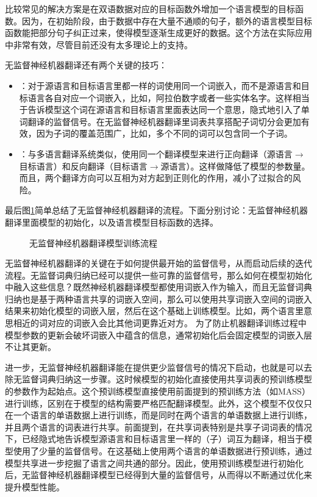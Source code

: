 \parinterval 比较常见的解决方案是在双语数据对应的目标函数外增加一个语言模型的目标函数。因为，在初始阶段，由于数据中存在大量不通顺的句子，额外的语言模型目标函数能把部分句子纠正过来，使得模型逐渐生成更好的数据。这个方法在实际应用中非常有效，尽管目前还没有太多理论上的支持。

\parinterval 无监督神经机器翻译还有两个关键的技巧：
\begin{itemize}
\item {\small{}}：对于源语言和目标语言里都一样的词使用同一个词嵌入，而不是源语言和目标语言各自对应一个词嵌入，比如，阿拉伯数字或者一些实体名字。这样相当于告诉模型这个词在源语言和目标语言里面表达同一个意思，隐式地引入了单词翻译的监督信号。在无监督神经机器翻译里词表共享搭配子词切分会更加有效，因为子词的覆盖范围广，比如，多个不同的词可以包含同一个子词。

\vspace{0.5em}
\item {\small{}}：与多语言翻译系统类似，使用同一个翻译模型来进行正向翻译（源语言$\to$目标语言）和反向翻译（目标语言$\to$源语言）。这样做降低了模型的参数量。而且，两个翻译方向可以互相为对方起到正则化的作用，减小了过拟合的风险。
\end{itemize}

\parinterval 最后图\ref{fig:16-19}简单总结了无监督神经机器翻译的流程。下面分别讨论：无监督神经机器翻译里面模型的初始化，以及语言模型目标函数的选择。
\begin{figure}[h]
\centering

\caption{无监督神经机器翻译模型训练流程}
\label{fig:16-19}
\end{figure}


\parinterval 无监督神经机器翻译的关键在于如何提供最开始的监督信号，从而启动后续的迭代流程。无监督词典归纳已经可以提供一些可靠的监督信号，那么如何在模型初始化中融入这些信息？既然神经机器翻译模型都使用词嵌入作为输入，而且无监督词典归纳也是基于两种语言共享的词嵌入空间，那么可以使用共享词嵌入空间的词嵌入结果来初始化模型的词嵌入层，然后在这个基础上训练模型。比如，两个语言里意思相近的词对应的词嵌入会比其他词更靠近对方。 为了防止机器翻译训练过程中模型参数的更新会破坏词嵌入中蕴含的信息，通常初始化后会固定模型的词嵌入层不让其更新。

\parinterval 进一步，无监督神经机器翻译能在提供更少监督信号的情况下启动，也就是可以去除无监督词典归纳这一步骤。这时候模型的初始化直接使用共享词表的预训练模型的参数作为起始点。这个预训练模型直接使用前面提到的预训练方法（如MASS）进行训练，区别在于模型的结构需要严格匹配翻译模型。此外，这个模型不仅仅只在一个语言的单语数据上进行训练，而是同时在两个语言的单语数据上进行训练，并且两个语言的词表进行共享。前面提到，在共享词表特别是共享子词词表的情况下，已经隐式地告诉模型源语言和目标语言里一样的（子）词互为翻译，相当于模型使用了少量的监督信号。在这基础上使用两个语言的单语数据进行预训练，通过模型共享进一步挖掘了语言之间共通的部分。因此，使用预训练模型进行初始化后，无监督神经机器翻译模型已经得到大量的监督信号，从而得以不断通过优化来提升模型性能。

